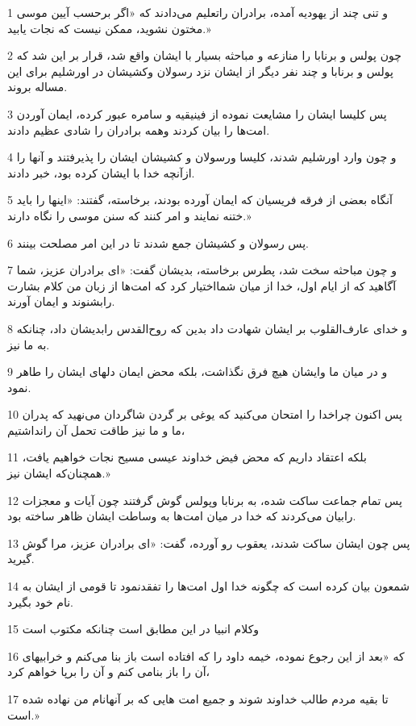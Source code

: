 \par 1 و تنی چند از یهودیه آمده، برادران راتعلیم می‌دادند که «اگر برحسب آیین موسی مختون نشوید، ممکن نیست که نجات یابید.»
\par 2 چون پولس و برنابا را منازعه و مباحثه بسیار با ایشان واقع شد، قرار بر این شد که پولس و برنابا و چند نفر دیگر از ایشان نزد رسولان وکشیشان در اورشلیم برای این مساله بروند.
\par 3 پس کلیسا ایشان را مشایعت نموده از فینیقیه و سامره عبور کرده، ایمان آوردن امت‌ها را بیان کردند وهمه برادران را شادی عظیم دادند.
\par 4 و چون وارد اورشلیم شدند، کلیسا ورسولان و کشیشان ایشان را پذیرفتند و آنها را ازآنچه خدا با ایشان کرده بود، خبر دادند.
\par 5 آنگاه بعضی از فرقه فریسیان که ایمان آورده بودند، برخاسته، گفتند: «اینها را باید ختنه نمایند و امر کنند که سنن موسی را نگاه دارند.»
\par 6 پس رسولان و کشیشان جمع شدند تا در این امر مصلحت بینند.
\par 7 و چون مباحثه سخت شد، پطرس برخاسته، بدیشان گفت: «ای برادران عزیز، شما آگاهید که از ایام اول، خدا از میان شمااختیار کرد که امت‌ها از زبان من کلام بشارت رابشنوند و ایمان آورند.
\par 8 و خدای عارف‌القلوب بر ایشان شهادت داد بدین که روح‌القدس رابدیشان داد، چنانکه به ما نیز.
\par 9 و در میان ما وایشان هیچ فرق نگذاشت، بلکه محض ایمان دلهای ایشان را طاهر نمود.
\par 10 پس اکنون چراخدا را امتحان می‌کنید که یوغی بر گردن شاگردان می‌نهید که پدران ما و ما نیز طاقت تحمل آن رانداشتیم،
\par 11 بلکه اعتقاد داریم که محض فیض خداوند عیسی مسیح نجات خواهیم یافت، همچنان‌که ایشان نیز.»
\par 12 پس تمام جماعت ساکت شده، به برنابا وپولس گوش گرفتند چون آیات و معجزات رابیان می‌کردند که خدا در میان امت‌ها به وساطت ایشان ظاهر ساخته بود.
\par 13 پس چون ایشان ساکت شدند، یعقوب رو آورده، گفت: «ای برادران عزیز، مرا گوش گیرید.
\par 14 شمعون بیان کرده است که چگونه خدا اول امت‌ها را تفقدنمود تا قومی از ایشان به نام خود بگیرد.
\par 15 وکلام انبیا در این مطابق است چنانکه مکتوب است
\par 16 که «بعد از این رجوع نموده، خیمه داود را که افتاده است باز بنا می‌کنم و خرابیهای آن را باز بنامی کنم و آن را برپا خواهم کرد،
\par 17 تا بقیه مردم طالب خداوند شوند و جمیع امت هایی که بر آنهانام من نهاده شده است.»
